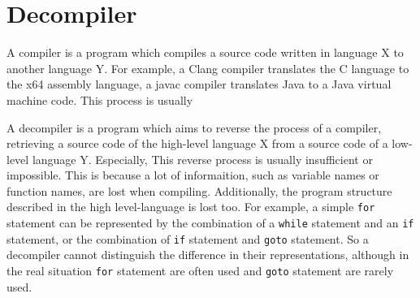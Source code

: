 \documentclass[senior,final,11pt]{iscs-thesis}
\begin{document}
\section{Decompiler}


A compiler is a program which compiles a source code written in language X to another language Y. 
For example, a Clang compiler translates the C language to the x64 assembly language, a javac compiler translates Java to a Java virtual machine code.
This process is usually 


A decompiler is a program which aims to reverse the process of a compiler, retrieving a source code of the high-level language X from a source code of a low-level language Y. 
Especially, 
This reverse process is usually insufficient or impossible.
This is because a lot of informaition, such as variable names or function names, are lost when compiling.
Additionally, the program structure described in the high level-language is lost too. 
For example, a simple \texttt{for} statement can be represented by the combination of a \texttt{while} statement and an \texttt{if} statement, or the combination of \texttt{if} statement and \texttt{goto} statement. 
So a decompiler cannot distinguish the difference in their representations, 
although in the real situation \texttt{for} statement are often used and \texttt{goto} statement are rarely used.




\end{document}
